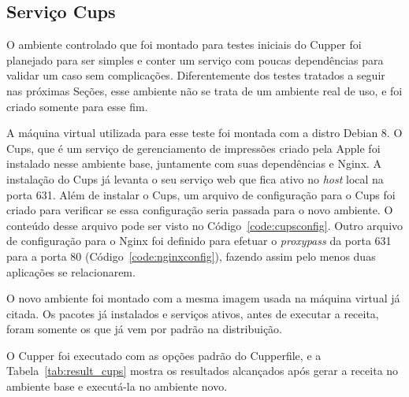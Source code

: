 \subsection{Serviço Cups}
O ambiente controlado que foi montado para testes iniciais do Cupper foi planejado
para ser simples e conter um serviço com poucas dependências para validar um caso
sem complicações. Diferentemente dos testes tratados a seguir nas próximas Seções,
esse ambiente não se trata de um ambiente real de uso, e foi criado somente para
esse fim.

A máquina virtual utilizada para esse teste foi montada com a distro Debian 8.
O Cups, que é um serviço de gerenciamento de impressões criado pela Apple foi
instalado nesse ambiente base, juntamente com suas dependências e Nginx. A instalação
do Cups já levanta o seu serviço web que fica ativo no \textit{host} local na porta 631.
Além de instalar o Cups, um arquivo de configuração para o Cups foi criado
para verificar se essa configuração seria passada para o novo ambiente. O
conteúdo desse arquivo pode ser visto no Código~\ref{code:cupsconfig}. Outro 
arquivo de configuração para o Nginx foi definido para efetuar o 
\textit{proxypass} da porta 631 para a porta 80 (Código~\ref{code:nginxconfig}), fazendo assim pelo menos duas
aplicações se relacionarem.

O novo ambiente foi montado com a mesma imagem usada na máquina virtual já citada.
Os pacotes já instalados e serviços ativos, antes de executar a receita, foram somente 
os que já vem por padrão na distribuição.

O Cupper foi executado com as opções padrão do Cupperfile, e a Tabela~\ref{tab:result_cups}
mostra os resultados alcançados após gerar a receita no ambiente base e executá-la
no ambiente novo.


